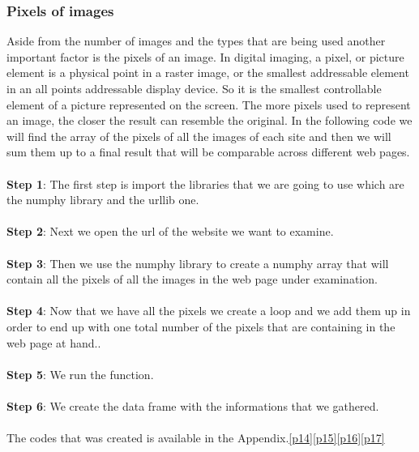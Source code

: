 \documentclass{book}
\begin{document}
\subsubsection{Pixels of images}\label{dif_img_s} 
Aside from the number of images and the types that are being used another important factor is the pixels of an image. In digital imaging, a pixel, or picture element is a physical point in a raster image, or the smallest addressable element in an all points addressable display device. So it is the smallest controllable element of a picture represented on the screen. The more pixels used to represent an image, the closer the result can resemble the original. In the following code we will find the array of the pixels of all the images of each site and then we will sum them up to a final result that will be comparable across different web pages. \\\\
\textbf{Step 1}: The first step is import the libraries that we are going to use which are the numphy library and the urllib one. \\\\
\textbf{Step 2}: Next we open the url of the website we want to examine.\\\\
\textbf{Step 3}: Then we use the numphy library to create a numphy array that will contain all the pixels of all the images in the web page under examination. \\\\
\textbf{Step 4}: Now that we have all the pixels we create a loop and we add them up in order to end up with one total number of the pixels that are containing in the web page at hand..\\\\
\textbf{Step 5}: We run the function.\\\\
\textbf{Step 6}: We create the data frame with the informations that we gathered.\\\\
The codes that was created is available in the Appendix.\ref{p14}\ref{p15}\ref{p16}\ref{p17}                 
\end{document}
